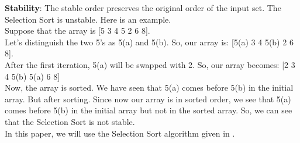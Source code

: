 \documentclass[article,10pt]{article}
\begin{document}
\begin{multicols}{2}
\textbf{Stability}: The stable order preserves the original order of the input set. The Selection Sort is unstable. Here is an example.\\
Suppose that the array is [5 3 4 5 2 6 8]. \\
Let's distinguish the two 5's as 5(a) and 5(b). So, our array is: [5(a) 3 4 5(b) 2 6 8].\\
After the first iteration, 5(a) will be swapped with 2. So, our array becomes: [2 3 4 5(b) 5(a) 6 8]\\
Now, the array is sorted. We have seen that 5(a) comes before 5(b) in the initial array. But after sorting.
Since now our array is in sorted order, we see that 5(a) comes before 5(b) in the initial array but not in the sorted array. So, we can see that the Selection Sort is not stable.\\
In this paper, we will use the Selection Sort algorithm given in \cite{Knuth-Selection}. 


      
        












\end{multicols}
\end{document}
